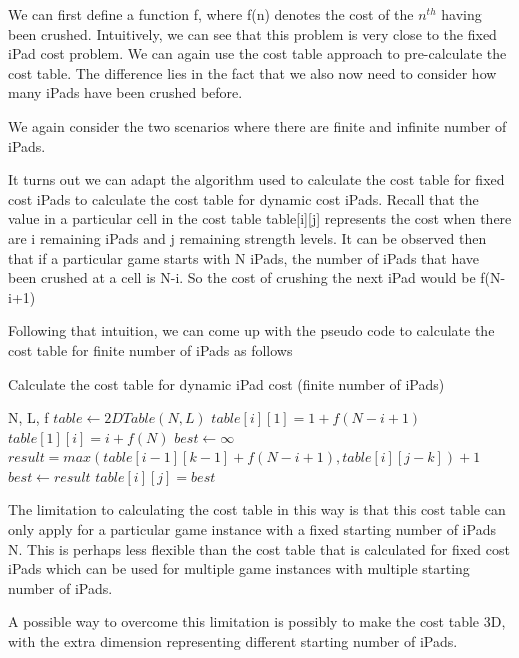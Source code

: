 \documentclass[12pt,a4paper,oneside]{report}
\begin{document}
We can first define a function f, where f(n) denotes the cost of the $n^{th}$ having been crushed.
Intuitively, we can see that this problem is very close to the fixed iPad cost problem. We can again use the cost table approach to pre-calculate the cost table. The difference lies in the fact that we also now need to consider how many iPads have been crushed before.

We again consider the two scenarios where there are finite and infinite number of iPads.

It turns out we can adapt the algorithm used to calculate the cost table for fixed cost iPads to calculate the cost table for dynamic cost iPads. Recall that the value in a particular cell in the cost table table[i][j] represents the cost when there are i remaining iPads and j remaining strength levels. It can be observed then that if a particular game starts with N iPads, the number of iPads that have been crushed at a cell is N-i. So the cost of crushing the next iPad would be f(N-i+1)

Following that intuition, we can come up with the pseudo code to calculate the cost table for finite number of iPads as follows

\begin{algorithm}[H]
\caption{Calculate the cost table for dynamic iPad cost (finite number of iPads)}
\begin{algorithmic}[1]
\REQUIRE N, L, f
\STATE $table \leftarrow 2DTable(N, L)$
	\STATE $table[i][1] = 1 + f(N-i+1)$
\ENDFOR
{}
	\STATE $table[1][i] = i + f(N)$
\ENDFOR
{}
		\STATE $best \leftarrow \infty$
			\STATE $result = max(table[i - 1][k - 1] + f(N-i+1), table[i][j - k]) + 1$
				\STATE $best \leftarrow result$
			\ENDIF
		\ENDFOR
		\STATE $table[i][j] = best$
	\ENDFOR
\ENDFOR
\end{algorithmic}
\end{algorithm}

The limitation to calculating the cost table in this way is that this cost table can only apply for a particular game instance with a fixed starting number of iPads N. This is perhaps less flexible than the cost table that is calculated for fixed cost iPads which can be used for multiple game instances with multiple starting number of iPads.

A possible way to overcome this limitation is possibly to make the cost table 3D, with the extra dimension representing different starting number of iPads.
\end{document}

